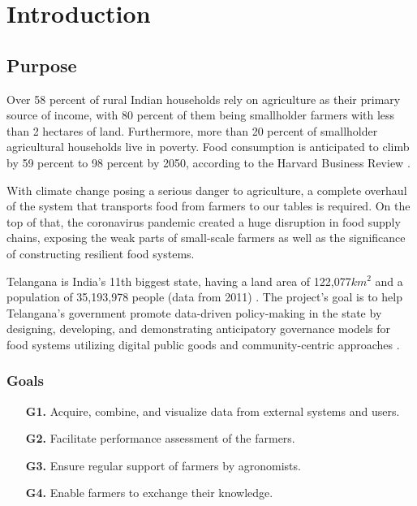 \chapter{Introduction}

\section{Purpose}



Over 58 percent of rural Indian households rely on agriculture as their primary source of income, with 80 percent of them being smallholder farmers with less than 2 hectares of land. Furthermore, more than 20 percent of smallholder agricultural households live in poverty. Food consumption is anticipated to climb by 59 percent to 98 percent by 2050, according to the Harvard Business Review \cite{global_demand_for_food}.

With climate change posing a serious danger to agriculture, a complete overhaul of the system that transports food from farmers to our tables is required. On the top of that, the coronavirus pandemic created a huge disruption in food supply chains, exposing the weak parts of small-scale farmers as well as the significance of constructing resilient food systems.

Telangana is India's 11th biggest state, having a land area of 122,077$km^2$ and a population of 35,193,978 people (data from 2011) \cite{telangana}. The project's goal is to help Telangana’s government promote data-driven policy-making in the state by designing, developing, and demonstrating anticipatory governance models for food systems utilizing digital public goods and community-centric approaches \cite{reference_doc}.

\subsection{Goals} \label{subsec:goals}
\begin{itemize}
	\item [\textbf{G1.}] Acquire, combine, and visualize data from external systems and users.
	\item [\textbf{G2.}] Facilitate performance assessment of the farmers.
	\item [\textbf{G3.}] Ensure regular support of farmers by agronomists.
	\item [\textbf{G4.}] Enable farmers to exchange their knowledge.
\end{itemize}

